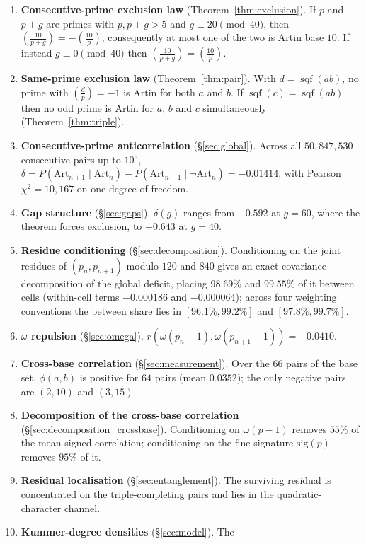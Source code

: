 \documentclass[11pt,reqno]{amsart}
\theoremstyle{plain}
\theoremstyle{definition}
\DeclareMathOperator{\sqf}{sqf}
\newcommand{\Art}{\mathrm{Art}}
\newcommand{\Lsym}[2]{\left(\tfrac{#1}{#2}\right)}
\begin{document}
\begin{enumerate}
	\item \textbf{Consecutive-prime exclusion law} (Theorem~\ref{thm:exclusion}). If $p$ and
	$p+g$ are primes with $p,p+g>5$ and $g\equiv 20 \pmod{40}$, then
	$\Lsym{10}{p+g}=-\Lsym{10}{p}$; consequently at most one of the two is Artin base $10$.
	If instead $g\equiv 0 \pmod{40}$ then $\Lsym{10}{p+g}=\Lsym{10}{p}$.
	\item \textbf{Same-prime exclusion law} (Theorem~\ref{thm:pair}). With $d=\sqf(ab)$, no
	prime with $\Lsym{d}{p}=-1$ is Artin for both $a$ and $b$. If $\sqf(c)=\sqf(ab)$ then no
	odd prime is Artin for $a$, $b$ and $c$ simultaneously (Theorem~\ref{thm:triple}).
	\item \textbf{Consecutive-prime anticorrelation} (\S\ref{sec:global}). Across all
	$50{,}847{,}530$ consecutive pairs up to $10^9$,
	$\delta = P(\Art_{n+1}\mid\Art_n)-P(\Art_{n+1}\mid\lnot\Art_n) = -0.01414$, with
	Pearson $\chi^2 = 10{,}167$ on one degree of freedom.
	\item \textbf{Gap structure} (\S\ref{sec:gaps}). $\delta(g)$ ranges from $-0.592$ at
	$g=60$, where the theorem forces exclusion, to $+0.643$ at $g=40$.
	\item \textbf{Residue conditioning} (\S\ref{sec:decomposition}). Conditioning on the
	joint residues of $(p_n,p_{n+1})$ modulo $120$ and $840$ gives an exact covariance
	decomposition of the global deficit, placing $98.69\%$ and $99.55\%$ of it between cells
	(within-cell terms $-0.000186$ and $-0.000064$); across four weighting conventions the
	between share lies in $[96.1\%,99.2\%]$ and $[97.8\%,99.7\%]$.
	\item \textbf{$\omega$ repulsion} (\S\ref{sec:omega}).
	$r(\omega(p_n-1),\omega(p_{n+1}-1)) = -0.0410$.
	\item \textbf{Cross-base correlation} (\S\ref{sec:measurement}). Over the $66$ pairs of
	the base set, $\phi(a,b)$ is positive for $64$ pairs (mean $0.0352$); the only negative
	pairs are $(2,10)$ and $(3,15)$.
	\item \textbf{Decomposition of the cross-base correlation} (\S\ref{sec:decomposition_crossbase}).
	Conditioning on $\omega(p-1)$ removes $55\%$ of the mean signed correlation; conditioning
	on the fine signature $\mathrm{sig}(p)$ removes $95\%$ of it.
	\item \textbf{Residual localisation} (\S\ref{sec:entanglement}). The surviving residual
	is concentrated on the triple-completing pairs and lies in the quadratic-character
	channel.
	\item \textbf{Kummer-degree densities} (\S\ref{sec:model}). The

\end{enumerate}
\end{document}
